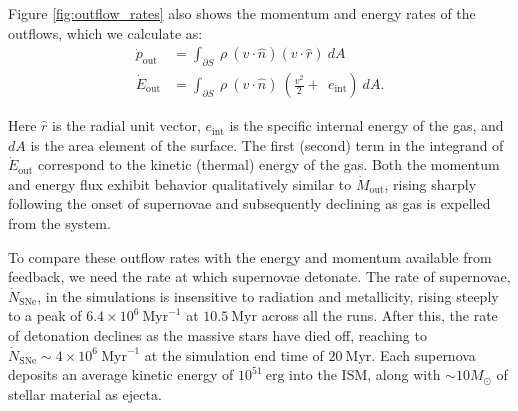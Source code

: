 \documentclass[twocolumn,linenumbers]{aastex631}
\begin{document}
Figure \ref{fig:outflow_rates} also shows the momentum and energy rates of the outflows, which we calculate as:
\begin{align}
    \dot{p}_\mathrm{out} &= \int_{\partial S}\ \rho \ (v \cdot \hat{n}) (v \cdot \hat{r})\ dA \\
    \dot{E}_\mathrm{out} &= \int_{\partial S}\ \rho \ (v \cdot \hat{n})\ (\frac{v^2}{2} + \ \ e_\mathrm{int})\ dA.
\end{align}

Here $\hat{r}$ is the radial unit vector, $e_\mathrm{int}$ is the specific internal energy of the gas, and $dA$ is the area element of the surface. The first (second) term in the integrand of $\dot{E}_\mathrm{out}$ correspond to the kinetic (thermal) energy of the gas. Both the momentum and energy flux exhibit behavior qualitatively similar to $\dot{M}_\mathrm{out}$, rising sharply following the onset of supernovae and subsequently declining as gas is expelled from the system. 

To compare these outflow rates with the energy and momentum available from feedback, we need the rate at which supernovae detonate. The rate of supernovae, $\dot{N}_\mathrm{SNe}$, in the simulations is insensitive to radiation and metallicity, rising steeply to a peak of $6.4\times10^6\ \mathrm{Myr}^{-1}$ at $10.5\ \mathrm{Myr}$ across all the runs. After this, the rate of detonation declines as the massive stars have died off, reaching to $\dot{N}_\mathrm{SNe} \sim 4\times10^6\ \mathrm{Myr}^{-1}$ at the simulation end time of $20\ \mathrm{Myr}$. Each supernova deposits an average kinetic energy of $10^{51}\ \mathrm{erg}$ into the ISM, along with $\sim 10 M_\odot$ of stellar material as ejecta. %
\end{document}
